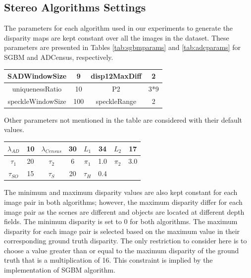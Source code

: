 \subsection{Stereo Algorithms Settings}
The parameters for each algorithm used in our experiments to generate the disparity
maps are kept constant over all the images in the dataset. These parameters are presented in Tables \ref{tab:sgbmparams} and \ref{tab:adcparams} 
for SGBM and ADCensus, respectively.

{\footnotesize
\begin{minipage}{\linewidth}
\begin{center}
\label{tab:sgbmparams}
\begin{tabular}{ |c|c|c|c|}
\hline
SADWindowSize & 9 & disp12MaxDiff & 2 \\ \hline
uniquenessRatio & 10 & P2 & 3*9 \\ \hline
speckleWindowSize & 100 & speckleRange & 2 \\ \hline
\end{tabular}
\end{center}
\end{minipage} \newline
}

Other parameters not mentioned in the table are considered with their default values.

{\footnotesize
\begin{minipage}{\linewidth}
\begin{center}
\label{tab:adcparams}
\begin{tabular}{|c|c|c|c|c|c|c|c|}
\hline
$\lambda_{AD}$ & 10 & $\lambda_{Census}$ & 30 & $L_{1}$ & 34 & $L_{2}$ & 17 \\ \hline
$\tau_{1}$ & 20 & $\tau_{2}$ & 6 & $\pi_{1}$ & 1.0 & $\pi_{2}$ & 3.0 \\ \hline 
$\tau_{SO}$ & 15 & $\tau_{S}$ & 20 & $\tau_{H}$ & 0.4 & & \\  \hline
\end{tabular}
\end{center}
\end{minipage} \newline
}

The minimum and maximum disparity values are also kept constant for each image pair in both algorithms; however, the maximum 
disparity differ for each image pair as the scenes are different
and objects are located at different depth fields.
The minimum disparity is set to $0$ for both algorithms. The maximum disparity for each image pair is selected based on the maximum value in their
corresponding ground truth disparity. The only restriction to consider here is to choose a value greater than or equal to 
the maximum disparity of the ground truth that is a multiplication of 16. This constraint
is implied by the implementation of SGBM algorithm.

